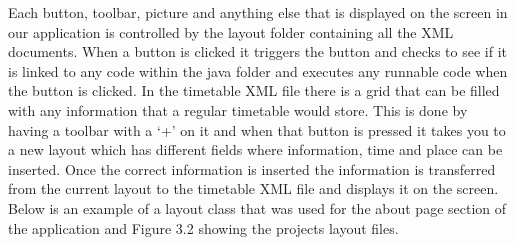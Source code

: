 Each button, toolbar, picture and anything else that is displayed on the screen in our application is controlled by the layout folder containing all the XML documents. When a button is clicked it triggers the button and checks to see if it is linked to any code within the java folder and executes any runnable code when the button is clicked. In the timetable XML file there is a grid that can be filled with any information that a regular timetable would store. This is done by having a toolbar with a ‘+’ on it and when that button is pressed it takes you to a new layout which has different fields where information, time and place can be inserted. Once the correct information is inserted the information is transferred from the current layout to the timetable XML file and displays it on the screen. Below is an example of a layout class that was used for the about page section of the application and Figure 3.2 showing the projects layout files.
 
